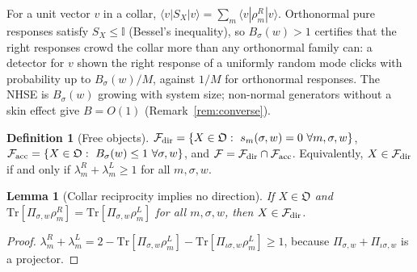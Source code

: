 \documentclass[11pt]{article}
\newtheorem{lemma}[theorem]{Lemma}
\theoremstyle{definition}
\newtheorem{definition}{Definition}
\theoremstyle{remark}
\newcommand{\Tr}{\mathrm{Tr}}
\newcommand{\one}{\mathbb{I}}
\newcommand{\Obj}{\mathfrak{O}}
\newcommand{\Free}{\mathcal{F}}
\newcommand{\isig}{\iota\sigma}
\begin{document}
For a unit vector $v$ in a collar, $\langle v|S_X|v\rangle=\sum_m\langle v|\rho^R_m|v\rangle$. Orthonormal pure responses satisfy $S_X\le\one$ (Bessel's inequality), so $B_\sigma(w)>1$ certifies that the right responses crowd the collar more than any orthonormal family can: a detector for $v$ shown the right response of a uniformly random mode clicks with probability up to $B_\sigma(w)/M$, against $1/M$ for orthonormal responses. The NHSE is $B_\sigma(w)$ growing with system size; non-normal generators without a skin effect give $B=O(1)$ (Remark~\ref{rem:converse}).

\begin{definition}[Free objects]\label{def:free}
$\Free_{\rm dir}=\{X\in\Obj:\ s_m(\sigma,w)=0\ \forall m,\sigma,w\}$, $\Free_{\rm acc}=\{X\in\Obj:\ B_\sigma(w)\le1\ \forall\sigma,w\}$, and $\Free=\Free_{\rm dir}\cap\Free_{\rm acc}$. Equivalently, $X\in\Free_{\rm dir}$ if and only if $\lambda^R_m+\lambda^L_m\ge1$ for all $m,\sigma,w$.
\end{definition}

\begin{lemma}[Collar reciprocity implies no direction]\label{lem:collarrec}
If $X\in\Obj$ and $\Tr[\Pi_{\sigma,w}\rho^R_m]=\Tr[\Pi_{\sigma,w}\rho^L_m]$ for all $m,\sigma,w$, then $X\in\Free_{\rm dir}$.
\end{lemma}
\begin{proof}
$\lambda^R_m+\lambda^L_m=2-\Tr[\Pi_{\sigma,w}\rho^L_m]-\Tr[\Pi_{\isig,w}\rho^L_m]\ge1$, because $\Pi_{\sigma,w}+\Pi_{\isig,w}$ is a projector.
\end{proof}
\end{document}
